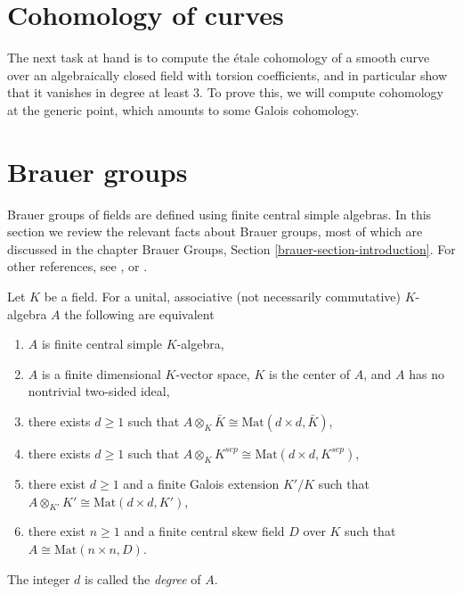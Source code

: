 







\section{Cohomology of curves}
\label{section-cohomology-curves}

\noindent
The next task at hand is to compute the \'etale cohomology of a smooth curve
over an algebraically closed field with torsion coefficients, and in
particular show that it vanishes in degree at least 3. To prove this, we
will compute cohomology at the generic point, which
amounts to some Galois cohomology.





\section{Brauer groups}
\label{section-brauer-groups}

\noindent
Brauer groups of fields are defined using finite central simple algebras.
In this section we review the relevant facts about Brauer groups, most of
which are discussed in the chapter
Brauer Groups, Section \ref{brauer-section-introduction}.
For other references, see \cite{SerreCorpsLocaux},
\cite{SerreGaloisCohomology} or \cite{Weil}.

\begin{theorem}
\label{theorem-central-simple-algebra}
Let $K$ be a field. For a unital, associative (not necessarily commutative)
$K$-algebra $A$ the following are equivalent
\begin{enumerate}
\item $A$ is finite central simple $K$-algebra,
\item $A$ is a finite dimensional $K$-vector space, $K$ is the center of $A$,
and $A$ has no nontrivial two-sided ideal,
\item there exists $d \geq 1$ such that
$A \otimes_K \bar K \cong \text{Mat}(d \times d, \bar K)$,
\item there exists $d \geq 1$ such that
$A \otimes_K K^{sep} \cong \text{Mat}(d \times d, K^{sep})$,
\item there exist $d \geq 1$ and a finite Galois extension $K'/K$
such that
$A \otimes_{K'} K' \cong \text{Mat}(d \times d, K')$,
\item there exist $n \geq 1$ and a finite central skew field $D$
over $K$ such that $A \cong \text{Mat}(n \times n, D)$.
\end{enumerate}
The integer $d$ is called the {\it degree} of $A$.
\end{theorem}

